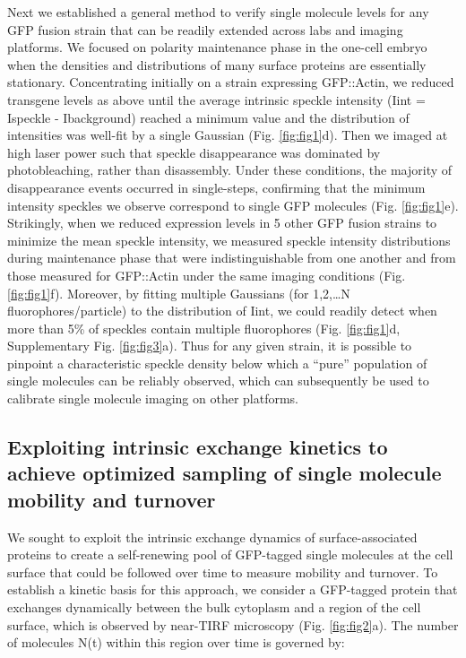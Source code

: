  Next we established a general method to verify single molecule levels for any GFP fusion strain that can be readily extended across labs and imaging platforms. We focused on polarity maintenance phase in the one-cell embryo when the densities and distributions of many surface proteins are essentially stationary. Concentrating initially on a strain expressing GFP::Actin, we reduced transgene levels as above until the average intrinsic speckle intensity (Iint = Ispeckle - Ibackground) reached a minimum value and the distribution of intensities was well-fit by a single Gaussian (Fig. \ref{fig:fig1}d). Then we imaged at high laser power such that speckle disappearance was dominated by photobleaching, rather than disassembly. Under these conditions, the majority of disappearance events occurred in single-steps, confirming that the minimum intensity speckles we observe correspond to single GFP molecules (Fig. \ref{fig:fig1}e). Strikingly, when we reduced expression levels in 5 other GFP fusion strains to minimize the mean speckle intensity, we measured speckle intensity distributions during maintenance phase that were indistinguishable from one another and from those measured for GFP::Actin under the same imaging conditions (Fig. \ref{fig:fig1}f). Moreover, by fitting multiple Gaussians (for 1,2,…N fluorophores/particle) to the distribution of Iint, we could readily detect when more than 5\% of speckles contain multiple fluorophores (Fig. \ref{fig:fig1}d, Supplementary Fig. \ref{fig:fig3}a). Thus for any given strain, it is possible to pinpoint a characteristic speckle density below which a “pure” population of single molecules can be reliably observed, which can subsequently be used to calibrate single molecule imaging on other platforms.
 
 
 \subsection{Exploiting intrinsic exchange kinetics to achieve optimized sampling of single molecule mobility and turnover}
 
 We sought to exploit the intrinsic exchange dynamics of surface-associated proteins to create a self-renewing pool of GFP-tagged single molecules at the cell surface that could be followed over time to measure mobility and turnover. To establish a kinetic basis for this approach, we consider a GFP-tagged protein that exchanges dynamically between the bulk cytoplasm and a region of the cell surface, which is observed by near-TIRF microscopy (Fig. \ref{fig:fig2}a). The number of molecules N(t) within this region over time is governed by:
 
